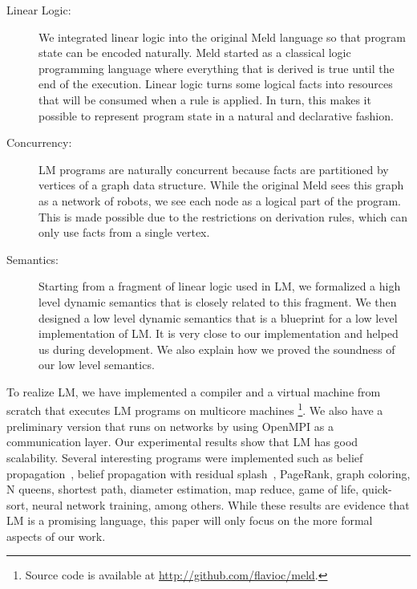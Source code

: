 \begin{description}
   \item[Linear Logic:] We integrated linear logic into the original Meld language so that program state can be encoded naturally.
   Meld started as a classical logic programming language where everything that is derived is true until the end
   of the execution. Linear logic turns some logical facts into resources that will be consumed when a rule is applied. In turn, this makes it possible to represent program state in a natural and declarative fashion.
   \item[Concurrency:] LM programs are naturally concurrent because facts are partitioned by vertices of a graph data structure. While the original Meld sees this graph as a network of robots, we see each node as a logical part of the program. This is made possible due to the restrictions on derivation rules, which can only use facts from a single vertex.
   \item[Semantics:] Starting from a fragment of linear logic used in LM, we formalized a high level dynamic semantics that is closely related to this fragment.
   We then designed a low level dynamic semantics that is a blueprint for a low level implementation of LM. It is very
   close to our implementation and helped us during development. We also explain how we proved the soundness of our low level semantics.
\end{description}

To realize LM, we have implemented a compiler and a virtual machine from scratch that executes LM programs on multicore machines
\footnote{Source code is available at \url{http://github.com/flavioc/meld}.}. We also have a preliminary version that runs on networks by
using OpenMPI as a communication layer. Our experimental results show that LM has good scalability.
Several interesting programs were implemented such as belief propagation~\cite{Gonzalez+al:aistats09paraml},
belief propagation with residual splash~\cite{Gonzalez+al:aistats09paraml}, PageRank, graph coloring,
N queens, shortest path, diameter estimation, map reduce, game of life, quick-sort, neural network training, among others.
While these results are evidence that LM is a promising language, this paper will only focus on the more formal aspects of our work.
